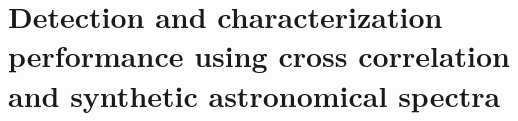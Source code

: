 \chapter{Detection and characterization performance using cross correlation and synthetic astronomical spectra}
\label{chap:II.3}

